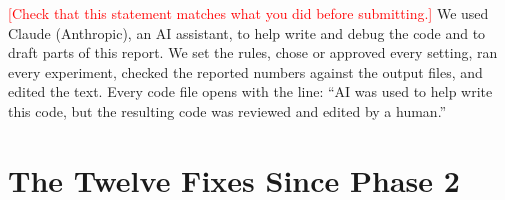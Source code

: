 \documentclass[sigconf,nonacm,10pt]{acmart}
\newcommand{\pending}[1]{\textcolor{red}{[#1]}}
\begin{document}
\pending{Check that this statement matches what you did before submitting.} We used Claude (Anthropic), an AI assistant, to help write and debug the code and to draft parts of this report. We set the rules, chose or approved every setting, ran every experiment, checked the reported numbers against the output files, and edited the text. Every code file opens with the line: ``AI was used to help write this code, but the resulting code was reviewed and edited by a human.''




\appendix

\section{The Twelve Fixes Since Phase 2}
\label{app:fixes}
\end{document}
